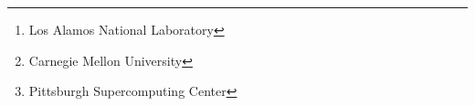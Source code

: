 \title{\TITLE}
\author{
    John Bent\thanks{Los Alamos National Laboratory},
    Garth Gibson\thanks{Carnegie Mellon University},
    Gary Grider\footnotemark[1],
    Ben McClelland\footnotemark[1],
    \\
    Paul Nowoczynski\thanks{Pittsburgh Supercomputing Center},
    James Nunez\footnotemark[1],
    Milo Polte\footnotemark[2],
    Meghan Wingate\footnotemark[1]
}
\date{}
\maketitle
\thispagestyle{empty}
\pagestyle{empty}
